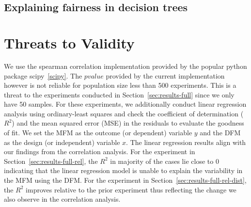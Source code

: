 \documentclass{article}
\begin{document}


\subsection{Explaining fairness in decision trees}\label{sec:discuss-explain-fair-dt}


\section{Threats to Validity}\label{sec:threats}

We use the spearman correlation implementation provided by the popular
python package scipy \ref{scipy}. The $pvalue$ provided by the current
implementation however is not reliable for population size less than
500 experiments. This is a threat to the experiments conducted in
Section \ref{sec:results-full} since we only have 50 samples. For
these experiments, we additionally conduct linear regression analysis
using ordinary-least squares and check the coefficient of
determination ($R^2$) and the mean squared error (MSE) in the
residuals to evaluate the goodness of fit. We set the MFM as the
outcome (or dependent) variable $y$ and the DFM as the design (or
independent) variable $x$. The linear regression results align with
our findings from the correlation analysis. For the experiment in
Section \ref{sec:results-full-rel}, the $R^2$ in majority of the cases
lie close to 0 indicating that the linear regression model is unable
to explain the variability in the MFM using the DFM. For the
experiment in Section \ref{sec:results-full-rel-dist}, the $R^2$
improves relative to the prior experiment thus reflecting the change
we also observe in the correlation analysis.

\end{document}
